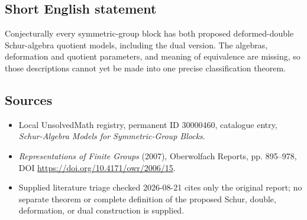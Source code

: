 \documentclass[11pt]{article}
\begin{document}
\subsection{Short English statement}
Conjecturally every symmetric-group block has both proposed deformed-double Schur-algebra quotient models, including the dual version. The algebras, deformation and quotient parameters, and meaning of equivalence are missing, so those descriptions cannot yet be made into one precise classification theorem.
\subsection{Sources}
\begin{itemize}
\item Local UnsolvedMath registry, permanent ID 30000460, catalogue entry, \emph{Schur-Algebra Models for Symmetric-Group Blocks}.
\item \emph{Representations of Finite Groups} (2007), Oberwolfach Reports, pp. 895--978, DOI \url{https://doi.org/10.4171/owr/2006/15}.
\item Supplied literature triage checked 2026-08-21 cites only the original report; no separate theorem or complete definition of the proposed Schur, double, deformation, or dual construction is supplied.
\end{itemize}
\end{document}
